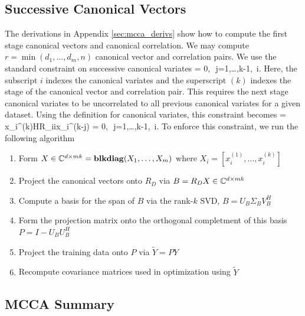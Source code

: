 \subsection{Successive Canonical Vectors}

The derivations in Appendix \ref{sec:mcca_derivs} show how to compute the first stage
canonical vectors and canonical correlation. We may compute $r=\min(d_1,\dots,d_m,n)$
canonical vector and correlation pairs. We use the standard constraint on successive
canonical variates
\be
{} = 0,\,\,  j=1,\dots,k-1,\,\,\,\forall i.
\ee
Here, the subscript $i$ indexes the canonical variates and the superscript $(k)$ indexes
the stage of the canonical vector and correlation pair. This requires the next stage
canonical variates to be uncorrelated to all previous canonical variates for a given
dataset. Using the definition for canonical variates, this constraint becomes
\be
{} = x_i^{(k)H}R_{ii}x_i^{(k-j)} = 0,\,\, 
j=1,\dots,k-1,\,\,\,\forall i. 
\ee
To enforce this constraint, we run the following algorithm
\begin{enumerate}
\item Form $X\in\mathbb{C}^{d\times mk}=\mathop{\bf blkdiag}(X_1,\dots,X_m)$ where $X_i = [x_i^{(1)},\dots,x_i^{(k)}]$
\item Project the canonical vectors onto $R_D$ via $B = R_DX \in\mathbb{C}^{d\times mk}$
\item Compute a basis for the span of $B$ via the rank-$k$ SVD, $B=U_B\Sigma_B V_B^H$
\item Form the projection matrix onto the orthogonal completment of this basis $P = I -
  U_BU_B^H$
\item Project the training data onto $P$ via $\widetilde{Y} = PY$
\item Recompute covariance matrices used in optimization using $\widetilde{Y}$
\end{enumerate}

\subsection{MCCA Summary}\label{sec:summary}

